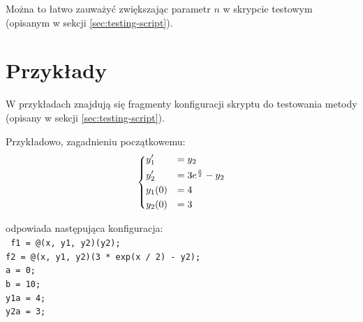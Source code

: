 \documentclass[12pt]{article}
\begin{document}
	Można to łatwo zauważyć zwiększając parametr $n$ w skrypcie testowym (opisanym w sekcji \ref{sec:testing-script}).
	
	
	
	\section{Przykłady}
	W przykładach znajdują się fragmenty konfiguracji skryptu do testowania metody (opisany w sekcji \ref{sec:testing-script}).
	
	Przykładowo, zagadnieniu początkowemu:
	\begin{align*}
	\begin{dcases}
		y_1' &= y_2 \\
		y_2' &= 3e^\frac{x}{2} - y_2 \\
		y_1(0) &= 4 \\
		y_2(0) &= 3
	\end{dcases}
	\end{align*}
	
	odpowiada następująca konfiguracja:
	\\
	\texttt{
		f1 = @(x, y1, y2)(y2); \\
		f2 = @(x, y1, y2)(3 * exp(x / 2) - y2); \\
		a = 0; \\
		b = 10; \\
		y1a = 4; \\
		y2a = 3; \\	
	}
\end{document}

